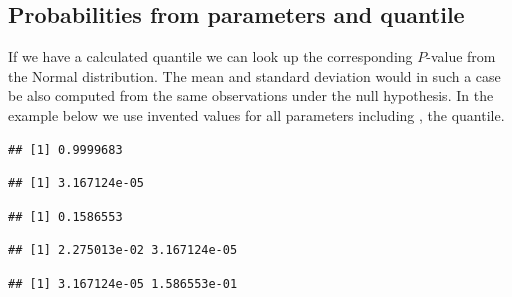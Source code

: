\documentclass[krantz2]{krantz}\usepackage{knitr}%
\begin{document}
\subsection{Probabilities from parameters and quantile}\label{sec:prob:quant}

If we have a calculated quantile we can look up the corresponding $P$-value from the Normal distribution. The mean and standard deviation would in such a case be also computed from the same observations under the null hypothesis. In the example below we use invented values for all parameters including , the quantile.

\begin{knitrout}\footnotesize
{}\color{fgcolor}\begin{kframe}
\begin{alltt}
\hlstd{(} \hlstd{=} \hlstd{,}  \hlstd{=} \hlstd{,}  \hlstd{=} \hlstd{)}
\end{alltt}
\begin{verbatim}
## [1] 0.9999683
\end{verbatim}
\begin{alltt}
\hlstd{(} \hlstd{=} \hlstd{,}  \hlstd{=} \hlstd{,}  \hlstd{=} \hlstd{,}  \hlstd{=} \hlstd{)}
\end{alltt}
\begin{verbatim}
## [1] 3.167124e-05
\end{verbatim}
\begin{alltt}
\hlstd{(} \hlstd{=} \hlstd{,}  \hlstd{=} \hlstd{,}  \hlstd{=} \hlstd{,}  \hlstd{=} \hlstd{)}
\end{alltt}
\begin{verbatim}
## [1] 0.1586553
\end{verbatim}
\begin{alltt}
\hlstd{(} \hlstd{=} \hlstd{(}\hlstd{,} \hlstd{),}  \hlstd{=} \hlstd{,}  \hlstd{=} \hlstd{,}  \hlstd{=} \hlstd{)}
\end{alltt}
\begin{verbatim}
## [1] 2.275013e-02 3.167124e-05
\end{verbatim}
\begin{alltt}
\hlstd{(} \hlstd{=} \hlstd{,}  \hlstd{=} \hlstd{,}  \hlstd{=} \hlstd{(}\hlstd{,} \hlstd{),}  \hlstd{=} \hlstd{)}
\end{alltt}
\begin{verbatim}
## [1] 3.167124e-05 1.586553e-01
\end{verbatim}
\end{kframe}
\end{knitrout}
\end{document}

